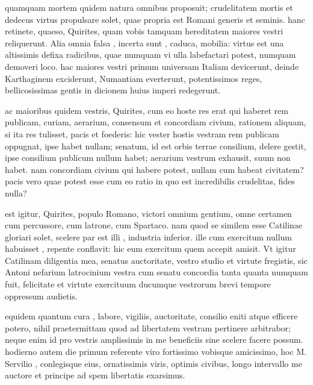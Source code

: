  quamquam mortem quidem natura omnibus proposuit; crudelitatem mortis et dedecus virtus propulsare solet, quae propria est Romani generis et seminis. hanc retinete, quaeso, Quirites, quam vobis tamquam hereditatem maiores vestri reliquerunt. Alia omnia falsa , incerta sunt , caduca, mobilia: virtus est una altissimis defixa radicibus, quae numquam vi ulla labefactari potest, numquam demoveri loco. hac maiores vestri primum universam Italiam devicerunt, deinde Karthaginem exciderunt, Numantiam everterunt, potentissimos reges, bellicosissimas gentis in dicionem huius imperi redegerunt.

 ac maioribus quidem vestris, Quirites, cum eo hoste res erat qui haberet rem publicam, curiam, aerarium, consensum et concordiam civium, rationem aliquam, si ita res tulisset, pacis et foederis: hic vester hostis vestram rem publicam oppugnat, ipse habet nullam; senatum, id est orbis terrae consilium, delere gestit, ipse consilium publicum nullum habet; aerarium vestrum exhausit, suum non habet. nam concordiam civium qui habere potest, nullam cum habeat civitatem? pacis vero quae potest esse cum eo ratio in quo est incredibilis crudelitas, fides nulla?

 est igitur, Quirites, populo Romano, victori omnium gentium, omne certamen cum percussore, cum latrone, cum Spartaco. nam quod se similem esse Catilinae gloriari solet, scelere par est illi , industria inferior. ille cum exercitum nullum habuisset , repente conflavit: hic eum exercitum quem accepit amisit. Vt igitur Catilinam diligentia mea, senatus auctoritate, vestro studio et virtute fregistis, sic Antoni nefarium latrocinium vestra cum senatu concordia tanta quanta numquam fuit, felicitate et virtute exercituum ducumque vestrorum brevi tempore oppressum audietis.

 equidem quantum cura , labore, vigiliis, auctoritate, consilio eniti atque efficere potero, nihil praetermittam quod ad libertatem vestram pertinere arbitrabor; neque enim id pro vestris amplissimis in me beneficiis sine scelere facere possum. hodierno autem die primum referente viro fortissimo vobisque amicissimo, hoc M. Servilio , conlegisque eius, ornatissimis viris, optimis civibus, longo intervallo me auctore et principe ad spem libertatis exarsimus.
